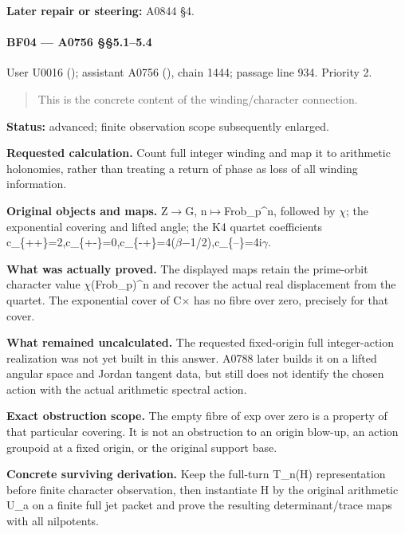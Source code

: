 \textbf{Later repair or steering:} A0844 §4.

\paragraph{BF04 --- A0756 §§5.1--5.4}\label{bf04-a0756-5.15.4}

User U0016 (\protect{});
assistant A0756 (\protect{}),
chain 1444; passage line 934. Priority 2.

\begin{quote}
This is the concrete content of the winding/character connection.
\end{quote}

\textbf{Status:} advanced; finite observation scope subsequently
enlarged.

\textbf{Requested calculation.} Count full integer winding and map it to
arithmetic holonomies, rather than treating a return of phase as loss of
all winding information.

\textbf{Original objects and maps.}
Z\allowbreak{}\ensuremath{→}\allowbreak{}G,
n\allowbreak{}\ensuremath{↦}\allowbreak{}Frob\_p\textasciicircum{}n,
followed by \allowbreak{}\ensuremath{χ}\allowbreak{}; the exponential
covering and lifted angle; the K4 quartet coefficients
c\_\{++\}=2,c\_\{+-\}=0,c\_\{-+\}=4(\allowbreak{}\ensuremath{β}\allowbreak{}\allowbreak{}\ensuremath{−}\allowbreak{}1/2),c\_\{–\}=4i\allowbreak{}\ensuremath{γ}\allowbreak{}.

\textbf{What was actually proved.} The displayed maps retain the
prime-orbit character value
\allowbreak{}\ensuremath{χ}\allowbreak{}(Frob\_p)\textasciicircum{}n and
recover the actual real displacement from the quartet. The exponential
cover of C\allowbreak{}\ensuremath{×}\allowbreak{} has no fibre over
zero, precisely for that cover.

\textbf{What remained uncalculated.} The requested fixed-origin full
integer-action realization was not yet built in this answer. A0788 later
builds it on a lifted angular space and Jordan tangent data, but still
does not identify the chosen action with the actual arithmetic spectral
action.

\textbf{Exact obstruction scope.} The empty fibre of exp over zero is a
property of that particular covering. It is not an obstruction to an
origin blow-up, an action groupoid at a fixed origin, or the original
support base.

\textbf{Concrete surviving derivation.} Keep the full-turn T\_n(H)
representation before finite character observation, then instantiate H
by the original arithmetic U\_a on a finite full jet packet and prove
the resulting determinant/trace maps with all nilpotents.

